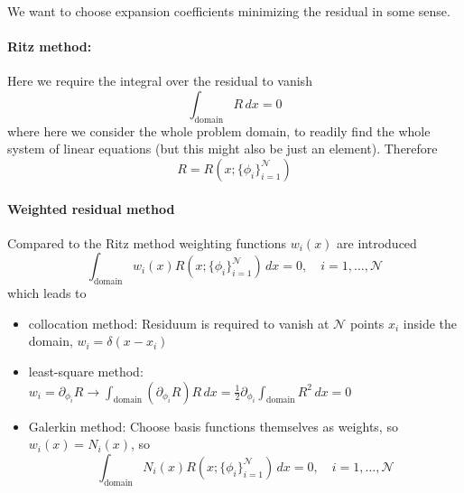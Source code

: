 We want to choose expansion coefficients minimizing the residual in some sense.
\paragraph{Ritz method:} Here we require the integral over the residual to vanish
\begin{equation}
    \int_{\text{domain}}{R} \, dx = 0
\end{equation}
where here we consider the whole problem domain, to readily find the whole
system of linear equations (but this might also be just an element).
Therefore
\begin{equation}
    R = R\left(x;\{\phi_i\}_{i=1}^\mathcal{N} \right)
\end{equation}

\paragraph{Weighted residual method} Compared to the Ritz method weighting functions
$w_i(x)$ are introduced
\begin{equation}
    \int_{\text{domain}} {w_i(x) R\left(x;\{\phi_i\}_{i=1}^\mathcal{N} \right)} \, dx = 0, \quad i = 1,\dots,\mathcal{N}
\end{equation}
which leads to
\begin{itemize}
    \item \textcolor{blue1}{collocation method}: Residuum is required to vanish at $\mathcal{N}$ points $x_i$ inside the domain, $w_i = \delta(x-x_i)$
    \item \textcolor{blue1}{least-square method}: $w_i = \partial_{\phi_i} R \rightarrow \int_{\text{domain}} (\partial_{\phi_i} R) R \, dx = \frac{1}{2} \partial_{\phi_i} \int_{\text{domain}} R^2 \, dx = 0$
    \item \textcolor{blue1}{Galerkin method}: Choose basis functions themselves as weights, so $w_i(x) = N_i(x)$, so
    \begin{equation}
        \int_{\text{domain}} N_i(x) R\left(x;\{\phi_i\}_{i=1}^\mathcal{N} \right) \, dx = 0, \quad i = 1,\dots,\mathcal{N}
    \end{equation}
\end{itemize}


